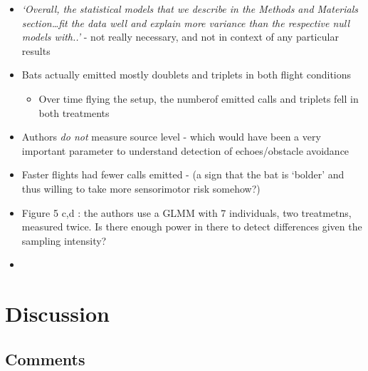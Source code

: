 \documentclass[
]{book}
\providecommand{\tightlist}{%
  \setlength{\itemsep}{0pt}\setlength{\parskip}{0pt}}
\begin{document}
\begin{itemize}
\tightlist
\item
  \emph{`Overall, the statistical models that we describe in the Methods and Materials section\ldots fit the data well and explain more variance than the respective null models with..'} - not really necessary, and not in context of any particular results
\item
  Bats actually emitted mostly doublets and triplets in both flight conditions

  \begin{itemize}
  \tightlist
  \item
    Over time flying the setup, the numberof emitted calls and triplets fell in both treatments
  \end{itemize}
\item
  Authors \emph{do not} measure source level - which would have been a very important parameter to understand detection of echoes/obstacle avoidance
\item
  Faster flights had fewer calls emitted - (a sign that the bat is `bolder' and thus willing to take more sensorimotor risk somehow?)
\item
  Figure 5 c,d : the authors use a GLMM with 7 individuals, two treatmetns, measured twice. Is there enough power in there to detect differences given the sampling intensity?
\item
\end{itemize}

\hypertarget{discussion-6}{%
\section{Discussion}\label{discussion-6}}

\hypertarget{comments-10}{%
\subsection{Comments}\label{comments-10}}
\end{document}
